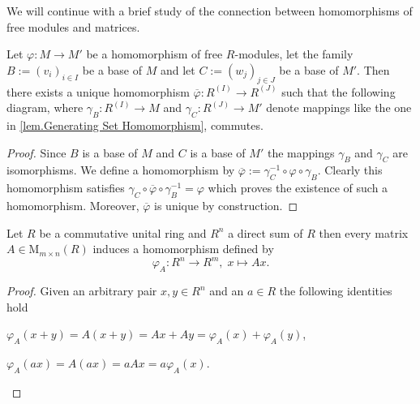 We will continue with a brief study of the connection between homomorphisms of free modules and matrices.

\begin{pro}\label{prop.Commutative Diagram of Free Modules}
Let $\varphi\colon M\to M'$ be a homomorphism of free $R$-modules, let the family $B:=(v_i)_{i\in I}$ be a base of $M$ and let $C:=(w_j)_{j\in J}$ be a base of $M'$. Then there exists a unique homomorphism $\overline{\varphi}\colon R^{(I)}\to R^{(J)}$ such that the following diagram, where $\gamma_B\colon R^{(I)}\to M$ and $\gamma_C\colon R^{(J)}\to M'$ denote mappings like the one in \cref{lem.Generating Set Homomorphism}, commutes.
\begin{center}
\end{center}
\end{pro}
\begin{proof}
Since $B$ is a base of $M$ and $C$ is a base of $M'$ the mappings $\gamma_B$ and $\gamma_C$ are isomorphisms. We define a homomorphism by $\overline{\varphi}:=\gamma_C^{-1}\circ\varphi\circ\gamma_B$. Clearly this homomorphism satisfies $\gamma_C\circ\overline{\varphi}\circ\gamma_B^{-1}=\varphi$ which proves the existence of such a homomorphism. Moreover, $\overline{\varphi}$ is unique by construction.
\end{proof}

\begin{cor}\label{cor.Matrix implies Homomorphism}
Let $R$ be a commutative unital ring and $R^n$ a direct sum of $R$ then every matrix $A\in\mathrm{M}_{m\times n}(R)$ induces a homomorphism defined by
\begin{equation*}
\varphi_A\colon R^n\to R^m,\; x\mapsto Ax.
\end{equation*}
\end{cor}
\begin{proof}
Given an arbitrary pair $x,y\in R^n$ and an $a\in R$ the following identities hold
\begin{exlist}
\item $\varphi_A(x+y)=A(x+y)=Ax+Ay=\varphi_A(x)+\varphi_A(y)$,
\item $\varphi_A(ax)=A(ax)=aAx=a\varphi_A(x)$.
\end{exlist}
\end{proof}

